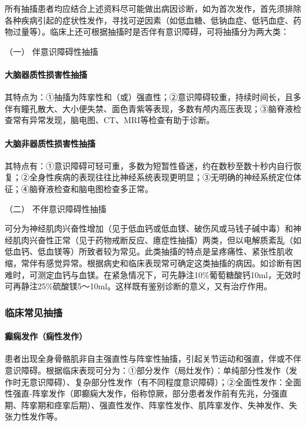 所有抽搐患者均应结合上述资料尽可能做出病因诊断，如为首次发作，首先须排除各种疾病引起的症状性发作，寻找可逆因素（如低血糖、低钠血症、低钙血症、药物过量等）。临床上还可根据抽搐时是否伴有意识障碍，可将抽搐分为两大类：

\hypertarget{text00016.htmlux5cux23CHP1-5-2-2-1}{}
（一） 伴意识障碍性抽搐

\paragraph{大脑器质性损害性抽搐}

其特点为：①抽搐为阵挛性和（或）强直性；②意识障碍较重，持续时间长，且多伴有瞳孔散大、大小便失禁、面色青紫等表现，多数有颅内高压表现；③脑脊液检查常有异常发现，脑电图、CT、MRI等检查有助于诊断。

\paragraph{大脑非器质性损害性抽搐}

其特点有：①意识障碍可轻可重，多数为短暂性昏迷，约在数秒至数十秒内自行恢复；②全身性疾病的表现往往比神经系统表现更明显；③无明确的神经系统定位体征；④脑脊液检查和脑电图检查多正常。

\hypertarget{text00016.htmlux5cux23CHP1-5-2-2-2}{}
（二） 不伴意识障碍性抽搐

可分为神经肌肉兴奋性增加（见于低血钙或低血镁、破伤风或马钱子碱中毒）和神经肌肉兴奋性正常（见于药物戒断反应、癔症性抽搐）两类，但以电解质紊乱（如低血钙、低血镁等）所致者较为常见。此类抽搐的特点是呈疼痛性、紧张性肌收缩，常伴有感觉异常。根据病史和临床表现常可确定这类抽搐的病因。如诊断有困难时，可测定血钙与血镁。在紧急情况下，可先静注10\%葡萄糖酸钙10ml，无效时可再静注25\%硫酸镁5～10ml。这样既有鉴别诊断的意义，又有治疗作用。

\subsubsection{临床常见抽搐}

\paragraph{癫痫发作（痫性发作）}

患者出现全身骨骼肌非自主强直性与阵挛性抽搐，引起关节运动和强直，伴或不伴意识障碍。根据临床表现可分为：①部分发作（局灶发作）：单纯部分性发作（发作时无意识障碍）、复杂部分性发作（有不同程度意识障碍）；②全面性发作：全面性强直-阵挛发作（即癫痫大发作，俗称惊厥，部分患者发作前有先兆，分强直期、阵挛期和痉挛后期）、强直性发作、阵挛性发作、肌阵挛发作、失神发作、失张力性发作等。

